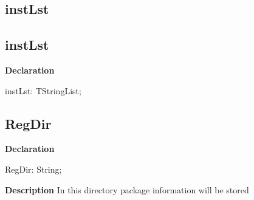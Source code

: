 \documentclass{report}
\newif\ifpdf
\begin{document}
\subsection*{\large{\textbf{instLst}}\normalsize\hspace{1ex}\hrulefill}
\else
\subsection*{instLst}
\fi
\label{manager-instLst}
\begin{list}{}{
\setlength{\itemindent}{0cm}
\setlength{\listparindent}{0cm}
\setlength{\leftmargin}{\evensidemargin}
\addtolength{\leftmargin}{\tmplength}
\settowidth{\labelsep}{X}
\addtolength{\leftmargin}{\labelsep}
\setlength{\labelwidth}{\tmplength}
}
\item[\textbf{Declaration}\hfill]
\ifpdf
\begin{flushleft}
\fi
\begin{ttfamily}
instLst: TStringList;\end{ttfamily}

\ifpdf
\end{flushleft}
\fi

\end{list}
\ifpdf
\subsection*{\large{\textbf{RegDir}}\normalsize\hspace{1ex}\hrulefill}
\else
\subsection*{RegDir}
\fi
\label{manager-RegDir}
\begin{list}{}{
\setlength{\itemindent}{0cm}
\setlength{\listparindent}{0cm}
\setlength{\leftmargin}{\evensidemargin}
\addtolength{\leftmargin}{\tmplength}
\settowidth{\labelsep}{X}
\addtolength{\leftmargin}{\labelsep}
\setlength{\labelwidth}{\tmplength}
}
\item[\textbf{Declaration}\hfill]
\ifpdf
\begin{flushleft}
\fi
\begin{ttfamily}
RegDir: String;\end{ttfamily}

\ifpdf
\end{flushleft}
\fi

\par
\item[\textbf{Description}]
In this directory package information will be stored

\end{list}
\end{document}
